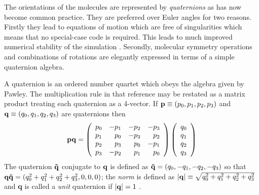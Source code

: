 \label{sec:quaternions}
The orientations of the molecules are represented by {\em quaternions}
as  has now  become common  practice.   They are  preferred over Euler
angles for two reasons. Firstly they lead to equations of motion which
are  free  of singularities   \cite{evans;77} which   means  that   no
special-case  code is required. This  leads to much improved numerical
stability      of  the  simulation  \cite{evans&murad:77}.   Secondly,
molecular symmetry   operations   and  combinations of  rotations  are
elegantly expressed   in    terms  of     a     simple      quaternion
algebra\cite{evans&murad:77,pawley&dove:85}.

A quaternion  is an ordered number  quartet  which obeys  the  algebra
given  by   Pawley\cite{pawley:81}.  The multiplication   rule in that
reference may be restated as a matrix product treating each quaternion
as a  4-vector.  If  ${\bf p} \equiv (p_0,p_1,p_2,p_3)$ and  ${\bf q}
\equiv  (q_0,q_1,q_2,q_3)$  are quaternions then
\begin{equation}
{\bf pq} = 
\left(
\begin{array}{rrrr}
p_0 & -p_1 & -p_2 & -p_3 \\
p_1 &  p_0 & -p_3 &  p_2 \\
p_2 &  p_3 &  p_0 & -p_1 \\
p_3 & -p_2 &  p_1 &  p_0 
\end{array}
\right) \left(
\begin{array}{r}
q_0 \\ q_1 \\ q_2 \\ q_3
\end{array}
\right)
\end{equation}
The quaternion $ {\bf \tilde{q}} $ conjugate to ${\bf q}$ is defined
as ${\bf \tilde{q}} = (q_0,-q_1,-q_2,-q_3)$ so that 
${\bf q\tilde{q}} = (q_0^2+q_1^2+q_2^2+q_3^2,0,0,0) $;
the {\em norm} is defined as $ |{\bf q}| \equiv
\sqrt{q_0^2+q_1^2+q_2^2+q_3^2} $ and {\bf q} is called a {\em unit}
quaternion if $ |{\bf q}| = 1 $ .  

